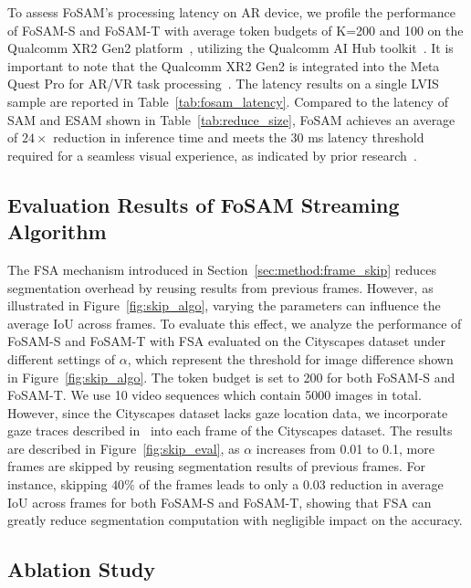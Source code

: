 \documentclass{article}
\begin{document}
To assess FoSAM's processing latency on AR device, we profile the performance of FoSAM-S and FoSAM-T with average token budgets of K=200 and 100 on the Qualcomm XR2 Gen2 platform~\cite{qualcomm_xr2_gen2}, utilizing the Qualcomm AI Hub toolkit~\cite{qualcomm_aihub}.
It is important to note that the Qualcomm XR2 Gen2 is integrated into the Meta Quest Pro for AR/VR task processing~\cite{quest_pro, engel2023project}. The latency results on a single LVIS sample are reported in Table~\ref{tab:fosam_latency}. Compared to the latency of SAM and ESAM shown in Table~\ref{tab:reduce_size}, FoSAM achieves an average of $24\times$ reduction in inference time and meets the 30 ms latency threshold required for a seamless visual experience, as indicated by prior research~\cite{kaaresoja2014towards, visual_requirement,albert2017latency}.


\subsection{Evaluation Results of FoSAM Streaming Algorithm}
The FSA mechanism introduced in Section~\ref{sec:method:frame_skip} reduces segmentation overhead by reusing results from previous frames. However, as illustrated in Figure~\ref{fig:skip_algo}, varying the parameters can influence the average IoU across frames. To evaluate this effect, we analyze the performance of FoSAM-S and FoSAM-T with FSA evaluated on the Cityscapes dataset under different settings of $\alpha$, which represent the threshold for image difference shown in Figure~\ref{fig:skip_algo}. The token budget is set to 200 for both FoSAM-S and FoSAM-T. We use 10 video sequences which contain 5000 images in total. However, since the Cityscapes dataset lacks gaze location data, we incorporate gaze traces described in~\cite{lv2024ariaeverydayactivitiesdataset} into each frame of the Cityscapes dataset. The results are described in Figure~\ref{fig:skip_eval}, as $\alpha$ increases from 0.01 to 0.1, more frames are skipped by reusing segmentation results of previous frames.
For instance, skipping $40\%$ of the frames leads to only a 0.03 reduction in average IoU across frames for both FoSAM-S and FoSAM-T, showing that FSA can greatly reduce segmentation computation with negligible impact on the accuracy. 

\subsection{Ablation Study}
\end{document}
